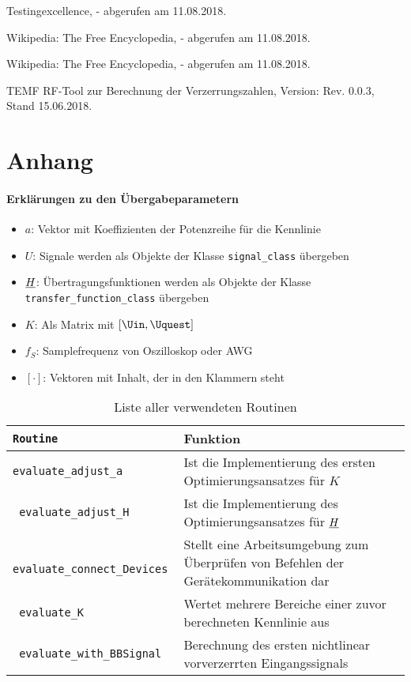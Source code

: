 \documentclass[../Report.tex]{subfiles}
\begin{document}
\begin{thebibliography}{9}
	Testingexcellence, 
	- abgerufen am 11.08.2018.
	
	Wikipedia: The Free Encyclopedia,
	- abgerufen am 11.08.2018.
	
	Wikipedia: The Free Encyclopedia,
	- abgerufen am 11.08.2018.
		
	TEMF RF-Tool zur Berechnung der Verzerrungszahlen, 
	Version: Rev. 0.0.3, 			
	Stand 15.06.2018.
	
\end{thebibliography}

\chapter{Anhang}
\label{chap:anhang}
\subsubsection{Erklärungen zu den Übergabeparametern}
\begin{itemize}
	\item $a$: Vektor mit Koeffizienten der Potenzreihe für die Kennlinie
	\item $U$: Signale werden als Objekte der Klasse \texttt{signal\_class} übergeben
	\item $\underline{H}$: Übertragungsfunktionen werden als Objekte der Klasse \texttt{transfer\_function\_class} übergeben
	\item $K$: Als Matrix mit $[\Uin, \Uquest]$
	\item $f_S$: Samplefrequenz von Oszilloskop oder AWG
	\item $[\cdot]$: Vektoren mit Inhalt, der in den Klammern steht
\end{itemize}

\begin{table}[H]
\centering 
\begin{tabular}[t]{| >{\texttt\bgroup}m{6cm}<{\egroup}|m{8cm}|} 
  \hline
    \textrm{\textbf{Routine}} & \textbf{Funktion} \\ 
  \hline \hline
  evaluate\_adjust\_a & Ist die Implementierung des ersten Optimierungsansatzes für $K$ \\
  \hline
  evaluate\_adjust\_H & Ist die Implementierung des Optimierungsansatzes für $\underline{H}$ \\
  \hline 
  evaluate\_connect\_Devices & Stellt eine Arbeitsumgebung zum Überprüfen von Befehlen der Gerätekommunikation dar\\
  \hline
  evaluate\_K & Wertet mehrere Bereiche einer zuvor berechneten Kennlinie aus\\
  \hline
  evaluate\_with\_BBSignal & Berechnung des ersten nichtlinear vorverzerrten Eingangssignals \\
  \hline
\end{tabular}
\caption{Liste aller verwendeten Routinen}
\label{tab:anhang.Funktionen.routine}
\end{table}
\end{document}

